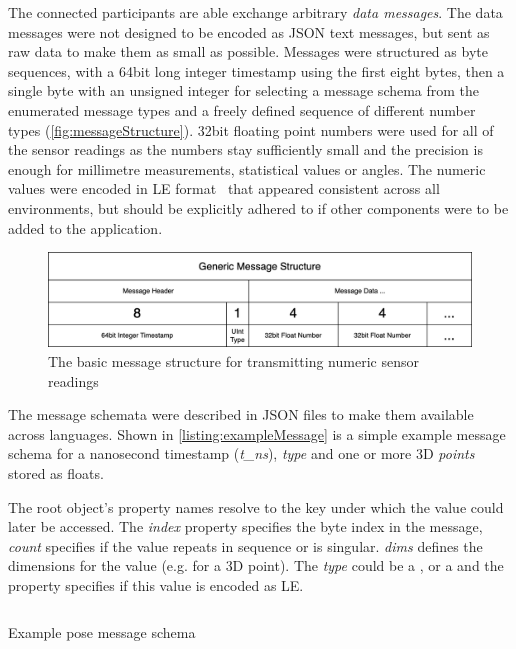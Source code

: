 The connected participants are able exchange arbitrary \emph{data messages}.
The data messages were not designed to be encoded as \ac{JSON} text messages, but sent as raw data to make them as small as possible.
Messages were structured as byte sequences, with a 64bit long integer timestamp using the first eight bytes, then a single byte with an unsigned integer for selecting a message schema from the enumerated message types and a freely defined sequence of different number types (\autoref{fig:messageStructure}).
32bit floating point numbers were used for all of the sensor readings as the numbers stay sufficiently small and the precision is enough for millimetre measurements, statistical values or angles.
The numeric values were encoded in \ac{LE} format~\parencite{cohenEndianess} that appeared consistent across all environments, but should be explicitly adhered to if other components were to be added to the application.

\begin{figure}[h]
\centering
\includegraphics[width=\textwidth]{04_Artefakte/01_Abbildungen/generic-message-structure}
\caption[Generic Message Structure]{The basic message structure for transmitting numeric sensor readings\protect}
\label{fig:messageStructure}
\end{figure}

The message schemata were described in \ac{JSON} files to make them available across languages.
Shown in \autoref{listing:exampleMessage} is a simple example message schema for a nanosecond timestamp (\emph{{t\_ns}}), \emph{type} and one or more \ac{3D} \emph{points} stored as floats.

The root object's property names resolve to the key under which the value could later be accessed.
The \emph{index} property specifies the byte index in the message, \emph{count} specifies if the value repeats in sequence or is singular. \emph{dims} defines the dimensions for the value (e.g.  for a \ac{3D} point).
The \emph{type} could be a ,  or a  and the property  specifies if this value is encoded as \ac{LE}.

\begin{listing}[!ht]
\inputminted{json}{04_Artefakte/03_Listings/example-pose-message.json}
\caption{Example pose message schema}
\label{listing:exampleMessage}
\end{listing}

